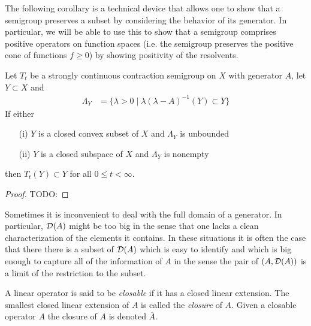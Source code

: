 The following corollary is a technical device that allows one to show that a semigroup preserves a subset by considering the behavior of its
generator.  In particular, we will be able to use this to show that a semigroup comprises positive operators on function spaces (i.e. the semigroup preserves
the positive cone of functions $f \geq 0$) by showing positivity of the resolvents.
\begin{cor}\label{SCCSInvarianceFromResolventInvariance}Let $T_t$ be a strongly continuous contraction semigroup on $X$ with generator $A$, let $Y \subset X$ and 
\begin{align*}
\Lambda_Y &= \lbrace \lambda > 0 \mid \lambda (\lambda - A)^{-1} (Y) \subset Y \rbrace
\end{align*}
If either
\begin{itemize}
\item[(i)] $Y$ is a closed convex subset of $X$ and $\Lambda_Y$ is unbounded
\item[(ii)] $Y$ is a closed subspace of $X$ and $\Lambda_Y$ is nonempty
\end{itemize}
then $T_t (Y) \subset Y$ for all $0 \leq t < \infty$.
\end{cor}
\begin{proof}
TODO:
\end{proof}

Sometimes it is inconvenient to deal with the full domain of a generator.  In particular, $\mathcal{D}(A)$ might be too big in the sense that one lacks a clean characterization of the elements it contains.  In these situations it is often the case that there there is a subset of $\mathcal{D}(A)$ which is easy to identify and which is big enough to capture all of the
information of $A$ in the sense the pair of $(A, \mathcal{D}(A))$ is a limit of the restriction to the subset.  
\begin{defn}A linear operator is said to be \emph{closable} if it has a closed linear extension.  The smallest closed linear extension of $A$ is called the \emph{closure} of $A$.  Given a closable operator $A$ the closure of $A$ is denoted $\overline{A}$.
\end{defn}

